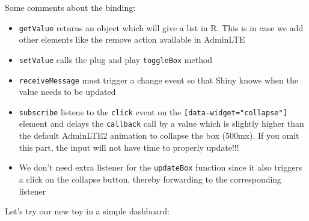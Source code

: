 \documentclass[]{book}
\newenvironment{Shaded}{\begin{snugshade}}{\end{snugshade}}
\newcommand{\AttributeTok}[1]{\textcolor[rgb]{0.77,0.63,0.00}{#1}}
\newcommand{\DataTypeTok}[1]{\textcolor[rgb]{0.13,0.29,0.53}{#1}}
\newcommand{\DecValTok}[1]{\textcolor[rgb]{0.00,0.00,0.81}{#1}}
\newcommand{\KeywordTok}[1]{\textcolor[rgb]{0.13,0.29,0.53}{\textbf{#1}}}
\newcommand{\NormalTok}[1]{#1}
\newcommand{\OperatorTok}[1]{\textcolor[rgb]{0.81,0.36,0.00}{\textbf{#1}}}
\newcommand{\StringTok}[1]{\textcolor[rgb]{0.31,0.60,0.02}{#1}}
\newcommand{\VariableTok}[1]{\textcolor[rgb]{0.00,0.00,0.00}{#1}}
\providecommand{\tightlist}{%
  \setlength{\itemsep}{0pt}\setlength{\parskip}{0pt}}
\begin{document}
\begin{Shaded}
\end{Shaded}

Some comments about the binding:

\begin{itemize}
\tightlist
\item
  \texttt{getValue} returns an object which will give a list in R. This is in case we add other elements like the remove action available in AdminLTE
\item
  \texttt{setValue} calls the plug and play \texttt{toggleBox} method
\item
  \texttt{receiveMessage} must trigger a change event so that Shiny knows when the value needs to be updated
\item
  \texttt{subscribe} listens to the \texttt{click} event on the \texttt{{[}data-widget="collapse"{]}} element and delays the \texttt{callback} call by a value which is slightly higher than the default AdminLTE2 animation to collapse the box (500mx). If you omit this part, the input will not have time to properly update!!!
\item
  We don't need extra listener for the \texttt{updateBox} function since it also triggers a click on the collapse button, thereby forwarding to the corresponding listener
\end{itemize}

Let's try our new toy in a simple dashboard:
\end{document}
